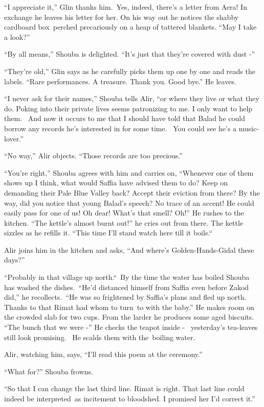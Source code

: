 \documentclass[twoside,11pt]{book}
\begin{document}
``I appreciate it,'' Glin thanks him.\ Yes, indeed, there's a letter from Aera! In exchange he
leaves his letter for her. On his way out he notices the shabby cardboard box\ perched precariously on a heap of
tattered blankets. ``May I take a look?'' \ 

``By all means,'' Shouba is delighted. ``It's just that they're covered with dust
-'' 

``They're old,'' Glin says as he carefully picks them up one by one and reads the labels.
``Rare performances. A treasure. Thank you. Good bye.'' He leaves.\ 

``I never ask for their names,'' Shouba tells Alir, ``or where they live or what they do. Poking into their
private lives seems patronizing to me. I only want to help them. ~And now it occurs to me that I should have told that
Balad he could borrow any records he's interested in for some time. \ You could see he's a music-lover.'' 

``No way,'' Alir objects. ``Those records are too precious.'' 

``You're right,'' Shouba agrees with him and carries on, ``Whenever one of them
shows up I think, what would Saffia have advised them to do? Keep on demanding their Pale Blue Valley back? Accept
their eviction from there? By the way, did you notice that young Balad{}'s speech? No trace of an accent! He could
easily pass for one of us! Oh dear! What's that smell? Oh!'' He rushes to the kitchen. ``The
kettle's almost burnt out!'' he cries out from there. The kettle sizzles as he refills it.
``This time I'll stand watch here till it boils.``\ 

Alir joins him in the kitchen and asks, ``And where's Golden-Hands-Gidal these days?'' 

``Probably in that village up north.``\ By the time the water has boiled Shouba has washed the
dishes.\ ``He'd distanced himself from Saffia even before Zakod did,'' he
recollects.\ ``He was so frightened by Saffia's plans and fled up north. Thanks to that Rimat had whom to
turn~to with the baby.'' He makes room on the crowded slab for two cups. From the larder he produces some
aged biscuits. ``The bunch that we were -'' He checks the teapot inside - \ yesterday's
tea-leaves still look promising. ~He scalds them with the\ boiling water.

Alir, watching him, says, ``I'll read this poem at the ceremony.''~ 

``What for?'' Shouba frowns.\ \ 

``So that I can change the last third line. Rimat is right. That last line could indeed be interpreted~as
incitement to bloodshed. I promised her I'd correct it.'' 
\end{document}
